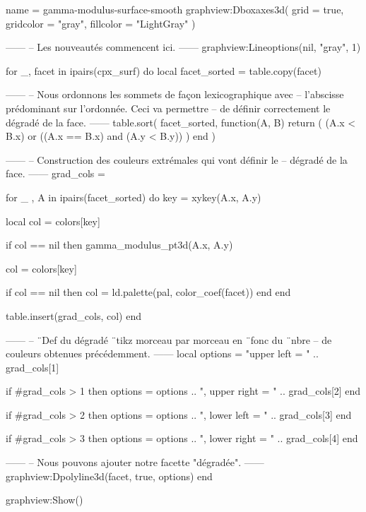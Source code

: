 \documentclass[border = 3pt]{standalone}
\begin{document}
\begin{luadraw*}{name = gamma-modulus-surface-smooth}
graphview:Dboxaxes3d({
  grid      = true,
  gridcolor = "gray",
  fillcolor = "LightGray"
})

------
-- Les nouveautés commencent ici.
------
graphview:Lineoptions(nil, "gray", 1)

for _, facet in ipairs(cpx_surf) do
  local facet_sorted = table.copy(facet)

------
-- Nous ordonnons les sommets de façon lexicographique avec
-- l'abscisse prédominant sur l'ordonnée. Ceci va permettre
-- de définir correctement le dégradé de la face.
------
  table.sort(
    facet_sorted,
    function(A, B)
      return (
        (A.x < B.x)
        or
        ((A.x == B.x) and (A.y < B.y))
      )
    end
  )

------
-- Construction des couleurs extrémales qui vont définir le
-- dégradé de la face.
------
  grad_cols = {}

  for _ , A in ipairs(facet_sorted) do
    key = xykey(A.x, A.y)

    local col = colors[key]

    if col ==  nil then
      gamma_modulus_pt3d(A.x, A.y)

      col = colors[key]

      if col ==  nil then
        col = ld.palette(pal, color_coef(facet))
      end
    end

    table.insert(grad_cols, col)
  end

------
-- ¨Def du dégradé ¨tikz morceau par morceau en ¨fonc du ¨nbre
-- de couleurs obtenues précédemment.
------
  local options = "upper left = " .. grad_cols[1]

  if #grad_cols > 1 then
    options = options .. ", upper right = " .. grad_cols[2]
  end

  if #grad_cols > 2 then
    options = options .. ", lower left = " .. grad_cols[3]
  end

  if #grad_cols > 3 then
    options = options .. ", lower right = " .. grad_cols[4]
  end

------
-- Nous pouvons ajouter notre facette "dégradée".
------
  graphview:Dpolyline3d(facet, true, options)
end

graphview:Show()
\end{luadraw*}
\end{document}

